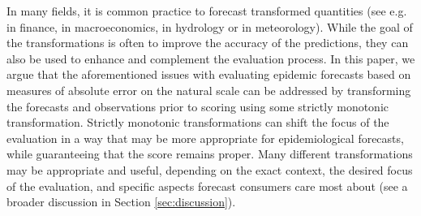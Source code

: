\documentclass[10pt,letterpaper]{article}
\begin{document}
In many fields, it is common practice to forecast transformed quantities (see e.g. \cite{taylorEvaluatingVolatilityInterval1999} in finance, \cite{mayrLogLevelVAR2015} in macroeconomics, \cite{loweStochasticRainfallrunoffForecasting2014} in hydrology or \cite{fuglstadDoesNonstationarySpatial2015} in meteorology). While the goal of the transformations is often to improve the accuracy of the predictions, they can also be used to enhance and complement the evaluation process. 
In this paper, we argue that the aforementioned issues with evaluating epidemic forecasts based on measures of absolute error on the natural scale can be addressed by transforming the forecasts and observations prior to scoring using some strictly monotonic transformation. Strictly monotonic transformations can shift the focus of the evaluation in a way that may be more appropriate for epidemiological forecasts, while guaranteeing that the score remains proper. Many different transformations may be appropriate and useful, depending on the exact context, the desired focus of the evaluation, and specific aspects forecast consumers care most about (see a broader discussion in Section \ref{sec:discussion}). 
\end{document}
